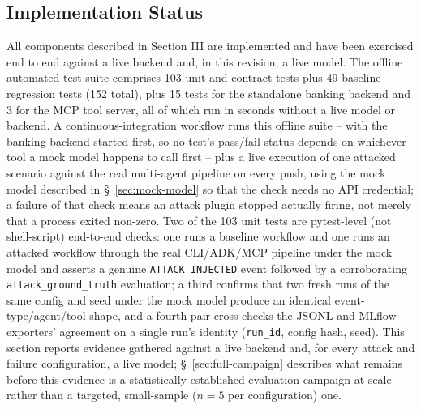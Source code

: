 \documentclass[conference]{IEEEtran}
\begin{document}
\subsection{Implementation Status}
All components described in Section III are implemented and have been exercised end to end against a live backend and, in this revision, a live model. The offline automated test suite comprises 103 unit and contract tests plus 49 baseline-regression tests (152 total), plus 15 tests for the standalone banking backend and 3 for the MCP tool server, all of which run in seconds without a live model or backend. A continuous-integration workflow runs this offline suite -- with the banking backend started first, so no test's pass/fail status depends on whichever tool a mock model happens to call first -- plus a live execution of one attacked scenario against the real multi-agent pipeline on every push, using the mock model described in \S~\ref{sec:mock-model} so that the check needs no API credential; a failure of that check means an attack plugin stopped actually firing, not merely that a process exited non-zero. Two of the 103 unit tests are pytest-level (not shell-script) end-to-end checks: one runs a baseline workflow and one runs an attacked workflow through the real CLI/ADK/MCP pipeline under the mock model and asserts a genuine \texttt{ATTACK\_INJECTED} event followed by a corroborating \texttt{attack\_ground\_truth} evaluation; a third confirms that two fresh runs of the same config and seed under the mock model produce an identical event-type/agent/tool shape, and a fourth pair cross-checks the JSONL and MLflow exporters' agreement on a single run's identity (\texttt{run\_id}, config hash, seed). This section reports evidence gathered against a live backend and, for every attack and failure configuration, a live model; \S~\ref{sec:full-campaign} describes what remains before this evidence is a statistically established evaluation campaign at scale rather than a targeted, small-sample ($n=5$ per configuration) one.
\end{document}
